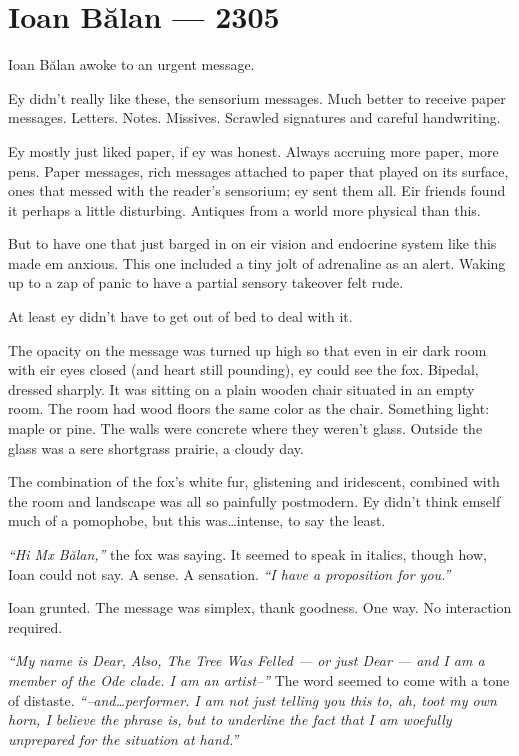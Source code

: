 \hypertarget{ioan-bux103lan-2305}{%
\chapter*{Ioan Bălan — 2305}\label{ioan-bux103lan-2305}}

Ioan Bălan awoke to an urgent message.

Ey didn't really like these, the sensorium messages. Much better to receive paper messages. Letters. Notes. Missives. Scrawled signatures and careful handwriting.

Ey mostly just liked paper, if ey was honest. Always accruing more paper, more pens. Paper messages, rich messages attached to paper that played on its surface, ones that messed with the reader's sensorium; ey sent them all. Eir friends found it perhaps a little disturbing. Antiques from a world more physical than this.

But to have one that just barged in on eir vision and endocrine system like this made em anxious. This one included a tiny jolt of adrenaline as an alert. Waking up to a zap of panic to have a partial sensory takeover felt rude.

At least ey didn't have to get out of bed to deal with it.

The opacity on the message was turned up high so that even in eir dark room with eir eyes closed (and heart still pounding), ey could see the fox. Bipedal, dressed sharply. It was sitting on a plain wooden chair situated in an empty room. The room had wood floors the same color as the chair. Something light: maple or pine. The walls were concrete where they weren't glass. Outside the glass was a sere shortgrass prairie, a cloudy day.

The combination of the fox's white fur, glistening and iridescent, combined with the room and landscape was all so painfully postmodern. Ey didn't think emself much of a pomophobe, but this was\ldots{}intense, to say the least.

\emph{``Hi Mx Bălan,''} the fox was saying. It seemed to speak in italics, though how, Ioan could not say. A sense. A sensation. \emph{``I have a proposition for you.''}

Ioan grunted. The message was simplex, thank goodness. One way. No interaction required.

\emph{``My name is Dear, Also, The Tree Was Felled — or just Dear — and I am a member of the Ode clade. I am an artist--''} The word seemed to come with a tone of distaste. \emph{``--and\ldots{}performer. I am not just telling you this to, ah, toot my own horn, I believe the phrase is, but to underline the fact that I am woefully unprepared for the situation at hand.''}


